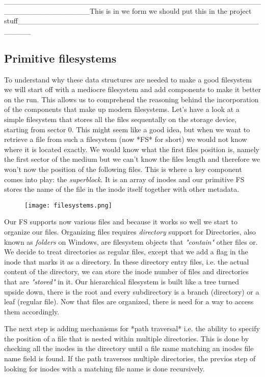 ________________________________________________________________This is in we form we should put this in the project stuff__________________________________________________

\subsection{Primitive filesystems}

To understand why these data structures are needed to make a good filesystem we will start off with a
mediocre filesystem and add components to make it better on the run. This allows us to comprehend the 
reasoning behind the incorporation of the components that make up modern filesystems.
Let's have a look at a simple filesystem that stores all the files sequentally on the storage device,
starting from sector 0. This might seem like a good idea, but when we want to retrieve a file from
such a filesystem (now *FS* for short) we would not know where it is located exactly. We would know
what the first files position is, namely the first sector of the medium but we can't know the files
length and therefore we won't now the  position of the following files. This is where a key component
comes into play: the \textit{superblock}. It is an array of inodes and our primitive FS stores the name of
the file in the inode itself together with other metadata.

\begin{figure}[h]
	\texttt{[image: filesystems.png]}
	\centering
\end{figure}

Our FS supports now various files and
because it works so well we start to organize our files. Organizing files requires \textit{directory}
support for Directories, also known as \textit{folders} on Windows, are filesystem objects that
\textit{"contain"} other files or. We decide to treat directories as regular files, except that we
add a flag in the inode that marks it as a directory. In these directory entry files, i.e. the actual
content of the directory, we can store the inode number of files and directories that are \textit{"stored"}
in it. Our hierarchical filesystem is built like a tree turned upside down, there is the root and every
subdirectory is a branch (directory) or a leaf (regular file). Now that files are organized, there is need
for a way to access them accordingly.

The next step is adding mechanisms for *path traversal* i.e. the
ability to specify the position of a file that is nested within multiple directories. This is done by
checking all the inodes in the directory until a file name matching an inodes file name field is
found. If the path traverses multiple directories, the previos step of looking for inodes with a
matching file name is done recursively.

